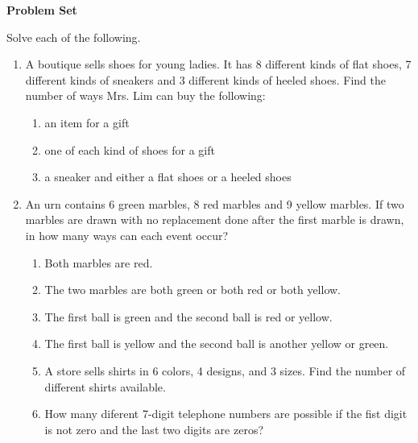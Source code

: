 \textbf{Problem Set}

\vspce

Solve each of the following.
{\begin{enumerate}[label = \arabic*. ]
\item A boutique sells shoes for young ladies. It has 8 different kinds of flat shoes, 7 different kinds of sneakers and 3 different kinds of heeled shoes. Find the number of ways Mrs. Lim can buy the following: 
\begin{enumerate}[label = \alph*. ]
\item an item for a gift
\item one of each kind of shoes for a gift
\item a sneaker and either a flat shoes or a heeled shoes
\end{enumerate} 
\item An urn contains 6 green marbles, 8 red marbles and 9 yellow marbles. If two marbles are drawn with no replacement done after the first marble is drawn, in how many ways can each event occur? 
\begin{enumerate}[label = \alph*. ]
\item Both marbles are red.
\item The two marbles are both green or both red or both yellow.
\item The first ball is green and the second ball is red or yellow.
\item The first ball is yellow and the second ball is another yellow or green.
\item A store sells shirts in 6 colors, 4 designs, and 3 sizes. Find the number of different shirts available.
\item How many diferent 7-digit telephone numbers are possible if the fist digit is not zero and the last two digits are zeros?
\end{enumerate} 

\end{enumerate}}


